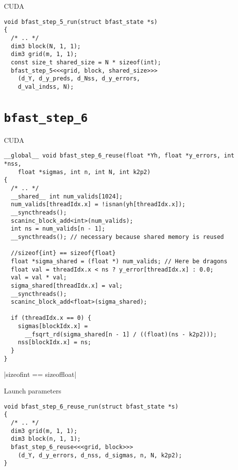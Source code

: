 \begin{frame}[fragile]{CUDA}

\begin{verbatim}
void bfast_step_5_run(struct bfast_state *s)
{
  /* .. */
  dim3 block(N, 1, 1);
  dim3 grid(m, 1, 1);
  const size_t shared_size = N * sizeof(int);
  bfast_step_5<<<grid, block, shared_size>>>
    (d_Y, d_y_preds, d_Nss, d_y_errors,
    d_val_indss, N);
\end{verbatim}

\end{frame}

\section{\texttt{bfast\_step\_6}} 


\begin{frame}[fragile]{CUDA}

\begin{verbatim}
__global__ void bfast_step_6_reuse(float *Yh, float *y_errors, int *nss,
    float *sigmas, int n, int N, int k2p2)
{
  /* .. */
  __shared__ int num_valids[1024];
  num_valids[threadIdx.x] = !isnan(yh[threadIdx.x]);
  __syncthreads();
  scaninc_block_add<int>(num_valids);
  int ns = num_valids[n - 1];
  __syncthreads(); // necessary because shared memory is reused

  //sizeof{int} == sizeof{float}
  float *sigma_shared = (float *) num_valids; // Here be dragons
  float val = threadIdx.x < ns ? y_error[threadIdx.x] : 0.0;
  val = val * val;
  sigma_shared[threadIdx.x] = val;
  __syncthreads();
  scaninc_block_add<float>(sigma_shared);

  if (threadIdx.x == 0) {
    sigmas[blockIdx.x] =
      __fsqrt_rd(sigma_shared[n - 1] / ((float)(ns - k2p2)));
    nss[blockIdx.x] = ns;
  }
}
\end{verbatim}
\pause
{}|sizeof{int} == sizeof{float}|

\end{frame}

\begin{frame}[fragile]{Launch parameters}
\begin{verbatim}
void bfast_step_6_reuse_run(struct bfast_state *s)
{
  /* .. */
  dim3 grid(m, 1, 1);
  dim3 block(n, 1, 1);
  bfast_step_6_reuse<<<grid, block>>>
    (d_Y, d_y_errors, d_nss, d_sigmas, n, N, k2p2);
}

\end{verbatim}
\end{frame}



